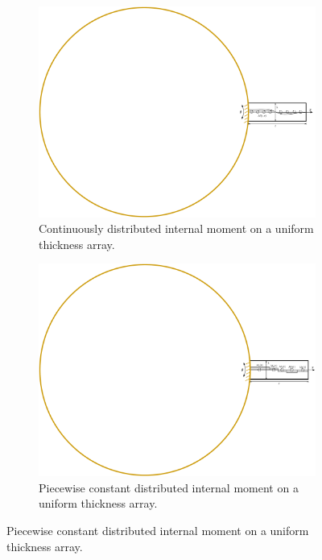\begin{figure}[t]
\centering

\begin{subfigure}[b]{0.49\columnwidth}
\centering 
\includegraphics[width=\columnwidth,trim=12.46in 5.3in 0in 5.44in,clip=true]{../ch7/figures/varbeam-c-ut-2}
\caption{Continuously distributed internal moment on a uniform thickness array.}\label{fig:ch7:varbeam-c-ut}
\end{subfigure}
\hspace{0.005\columnwidth}
\begin{subfigure}[b]{0.49\columnwidth}
\centering 
\includegraphics[width=\columnwidth,trim=12.46in 5.3in 0in 5.44in,clip=true]{../ch7/figures/varbeam-d-ut-2}
\caption{Piecewise constant distributed internal moment on a uniform thickness array.}\label{fig:ch7:varbeam-d-ut}
\end{subfigure}%


\end{figure}
